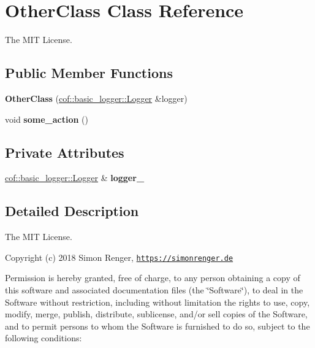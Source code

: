 \hypertarget{class_other_class}{}\section{Other\+Class Class Reference}
\label{class_other_class}


The M\+IT License.  


\subsection*{Public Member Functions}
\begin{DoxyCompactItemize}
\item 
\mbox{\label{class_other_class_a75ff344497533455df395e44f027898b}} 
{\bfseries Other\+Class} (\hyperlink{classcof_1_1basic__logger_1_1_logger}{cof\+::basic\+\_\+logger\+::\+Logger} \&logger)
\item 
\mbox{\label{class_other_class_a2c2c92c00eefee316f0e2e230d7e825c}} 
void {\bfseries some\+\_\+action} ()
\end{DoxyCompactItemize}
\subsection*{Private Attributes}
\begin{DoxyCompactItemize}
\item 
\mbox{\label{class_other_class_ab90611d7f32e34da6a24adc2bba272d7}} 
\hyperlink{classcof_1_1basic__logger_1_1_logger}{cof\+::basic\+\_\+logger\+::\+Logger} \& {\bfseries logger\+\_\+}
\end{DoxyCompactItemize}


\subsection{Detailed Description}
The M\+IT License. 

Copyright (c) 2018 Simon Renger, \href{https://simonrenger.de}{\tt https\+://simonrenger.\+de}

Permission is hereby granted, free of charge, to any person obtaining a copy of this software and associated documentation files (the \char`\"{}\+Software\char`\"{}), to deal in the Software without restriction, including without limitation the rights to use, copy, modify, merge, publish, distribute, sublicense, and/or sell copies of the Software, and to permit persons to whom the Software is furnished to do so, subject to the following conditions\+:

